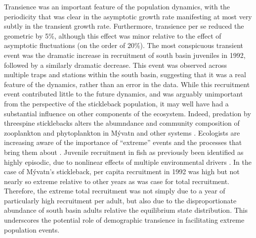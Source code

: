 \documentclass[11pt]{article}
\begin{document}
{Transience was an important feature of the population dynamics,
with the periodicity that was clear in the asymptotic growth rate manifesting 
at most very subtly in the transient growth rate.
Furthermore, transience per se reduced the geometric by 5\%,
although this effect was minor relative to the effect of asymptotic fluctuations
(on the order of 20\%). 
The most conspicuous transient event was the dramatic increase in recruitment of south basin juveniles in 1992, followed by a similarly dramatic decrease.
This event was observed across multiple traps and stations within the south basin,
suggesting that it was a real feature of the dynamics, rather than an error in the data.
While this recruitment event contributed little to the future dynamics, and was
arguably unimportant from the perspective of the stickleback population,
it may well have had a substantial influence on other components of the ecosystem.
Indeed, predation by threespine sticklebacks alters the 
abumndance and community composition of 
zooplankton and phytoplankton in M\'{y}vatn \citep{ersoy2017}
and other systems \citep{harmon2009}.
Ecologists are increasing aware of the importance of ``extreme'' events and the 
processes that bring them about \citep{anderson2017, batt2017}.
Juvenile recruitment in fish as previously been identified as highly episodic,
due to nonlinear effects of multiple environmental drivers \citep{dixon1999}.
In the case of M\'{y}vatn's stickleback, 
per capita recruitment in 1992 was high 
but not nearly so extreme relative to other years as was case for total recruitment.
Therefore, the extreme total recruitment was not simply due to a year of particularly
high recruitment per adult, 
but also due to the disproportionate abundance of south basin adults 
relative the equilibrium state distribution.
This underscores the potential role of demographic transience 
in facilitating extreme population events.

}
\end{document}
